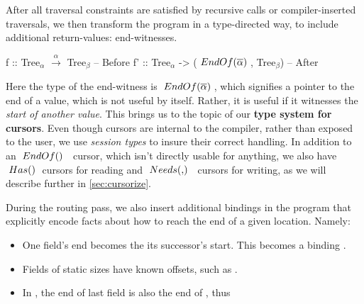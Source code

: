 \documentclass[a4paper,english]{lipics-v2016}
\newcommand{\travarr}[1]{\xrightarrow{#1}}
\newcommand{\fresh}[1]{\ensuremath{#1}}
\newcommand{\freshA}{\fresh{\alpha}}
\newcommand{\freshB}{\fresh{\beta}}
\newcommand{\locend}[1]{\ensuremath{\overline{#1}}}
\begin{document}
After all traversal constraints are satisfied by recursive calls or
compiler-inserted traversals, we then transform the program in a type-directed
way, to include additional return-values: end-witnesses.

\begin{code}
  f  :: Tree$_\freshA$ $\travarr{\freshA}$ Tree$_\freshB$                  -- Before
  f' :: Tree$_\freshA$ -> ($\ENDOF{\locend{\freshA}}$, Tree$_\freshB$) -- After
\end{code}


Here the type of the end-witness is $\ENDOF{\locend{\freshA}}$, which signifies
a pointer to the end of a value, which is not useful by itself.  Rather, it is
useful if it witnesses the {\em start of another value}.
%
This brings us to the topic of our {\bf type system for cursors}.  Even though
cursors are internal to the compiler, rather than exposed to the user, we use 
{\em session types} to insure their correct handling.  In addition to an
$\ENDOF$ cursor, which isn't directly usable for anything, we also have
$\; Has() \;$ cursors for reading and $\NEEDS{}$ cursors for writing, as we will
describe further in \cref{sec:cursorize}.

During the routing pass, we also insert additional bindings in the program that
explicitly encode facts about how to reach the end of a given location.  Namely:

\begin{itemize}
\item One field's end becomes the its successor's start.  This becomes a
  binding .
\item Fields of static sizes have known offsets, such as .  
\item In , the end of last field  is
  also the end of , thus \\ 
\end{itemize}
\end{document}
